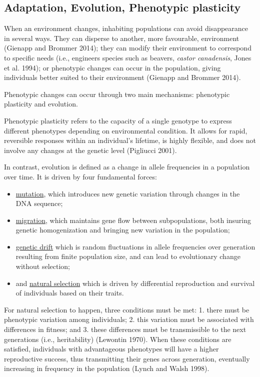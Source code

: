 \documentclass[
  12pt,
  letterpaper,
]{scrartcl}
\providecommand{\tightlist}{%
  \setlength{\itemsep}{0pt}\setlength{\parskip}{0pt}}
\begin{document}
\subsection{Adaptation, Evolution, Phenotypic
plasticity}\label{adaptation-evolution-phenotypic-plasticity}

When an environment changes, inhabiting populations can avoid
disappearance in several ways. They can disperse to another, more
favourable, environment (Gienapp and Brommer 2014); they can modify
their environment to correspond to specific needs (i.e., engineers
species such as beavers, \emph{castor canadensis}, Jones et al. 1994);
or phenotypic changes can occur in the population, giving individuals
better suited to their environment (Gienapp and Brommer 2014).

Phenotypic changes can occur through two main mechanisms: phenotypic
plasticity and evolution.

Phenotypic plasticity refers to the capacity of a single genotype to
express different phenotypes depending on environmental condition. It
allows for rapid, reversible responses within an individual's lifetime,
is highly flexible, and does not involve any changes at the genetic
level (Pigliucci 2001).

In contrast, evolution is defined as a change in allele frequencies in a
population over time. It is driven by four fundamental forces:

\begin{itemize}
\tightlist
\item
  \ul{mutation}, which introduces new genetic variation through changes
  in the DNA sequence;
\item
  \ul{migration}, which maintains gene flow between subpopulations, both
  insuring genetic homogenization and bringing new variation in the
  population;
\item
  \ul{genetic drift} which is random fluctuations in allele frequencies
  over generation resulting from finite population size, and can lead to
  evolutionary change without selection;
\item
  and \ul{natural selection} which is driven by differential
  reproduction and survival of individuals based on their traits.
\end{itemize}

For natural selection to happen, three conditions must be met: 1. there
must be phenotypic variation among individuals; 2. this variation must
be associated with differences in fitness; and 3. these differences must
be transmissible to the next generations (i.e., heritability) (Lewontin
1970). When these conditions are satisfied, individuals with
advantageous phenotypes will have a higher reproductive success, thus
transmitting their genes across generation, eventually increasing in
frequency in the population (Lynch and Walsh 1998).
\end{document}
